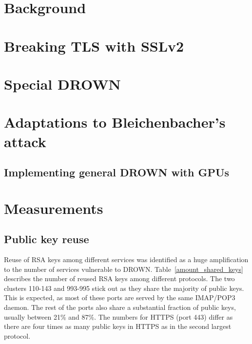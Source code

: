 \section{Background}


\section{Breaking TLS with SSLv2}


\section{Special DROWN}




\section{Adaptations to Bleichenbacher's attack}


\subsection{Implementing general DROWN with GPUs} 


\section{Measurements}


\subsection{Public key reuse}
\label{sec:pub_key_reuse}

Reuse of RSA keys among different services was identified as a huge
amplification to the number of services vulnerable to DROWN\@.
Table~\ref{amount_shared_keys} describes the number of reused RSA keys among
different protocols. The two clusters 110-143 and 993-995 stick out as they
share the majority of public keys. This is expected, as most of these ports
are served by the same IMAP/POP3 daemon. The rest of the ports also share a
substantial fraction of public keys, usually between 21\% and 87\%. The
numbers for HTTPS (port 443) differ as there are four times as many public
keys in HTTPS as in the second largest protocol.

